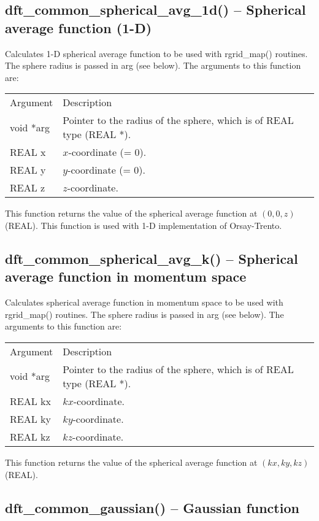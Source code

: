 \documentclass[12pt,letterpaper]{report}
\begin{document}
\subsection{dft\_common\_spherical\_avg\_1d() -- Spherical average function (1-D)}

Calculates 1-D spherical average function to be used with rgrid\_map() routines. The sphere radius is passed in arg (see below). The arguments to this function are:
\begin{longtable}{p{} p{}}
Argument & Description\\
\cline{1-2}
void *arg & Pointer to the radius of the sphere, which is of REAL type (REAL *).\\
REAL x & $x$-coordinate (= 0).\\
REAL y & $y$-coordinate (= 0).\\
REAL z & $z$-coordinate.\\
\end{longtable}
\noindent
This function returns the value of the spherical average function at $(0, 0, z)$ (REAL). This function is used with 1-D implementation of Orsay-Trento.

\subsection{dft\_common\_spherical\_avg\_k() -- Spherical average function in momentum space}

Calculates spherical average function in momentum space to be used with rgrid\_map() routines. The sphere radius is passed in arg (see below). The arguments to this function are:
\begin{longtable}{p{} p{}}
Argument & Description\\
\cline{1-2}
void *arg & Pointer to the radius of the sphere, which is of REAL type (REAL *).\\
REAL kx & $kx$-coordinate.\\
REAL ky & $ky$-coordinate.\\
REAL kz & $kz$-coordinate.\\
\end{longtable}
\noindent
This function returns the value of the spherical average function at $(kx, ky, kz)$ (REAL).

\subsection{dft\_common\_gaussian() -- Gaussian function}
\end{document}
